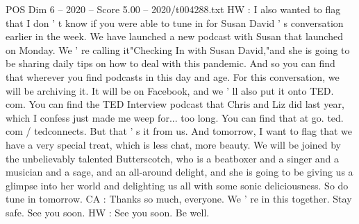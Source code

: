 \begin{textsample}{POS Dim 6 – 2020 – Score 5.00 – 2020/t004288.txt}
HW : I also wanted to flag that I don ' t know if you were able to tune in for Susan David ' s conversation earlier in the week.
We have launched a new podcast with Susan that launched on Monday.
We ' re calling it"Checking In with Susan David,"and she is going to be sharing daily tips on how to deal with this pandemic.
And so you can find that wherever you find podcasts in this day and age.
For this conversation, we will be archiving it.
It will be on Facebook, and we ' ll also put it onto TED. com.
You can find the TED Interview podcast that Chris and Liz did last year, which I confess just made me weep for... too long.
You can find that at go. ted. com / tedconnects.
But that ' s it from us.
And tomorrow, I want to flag that we have a very special treat, which is less chat, more beauty.
We will be joined by the unbelievably talented Butterscotch, who is a beatboxer and a singer and a musician and a sage, and an all-around delight, and she is going to be giving us a glimpse into her world and delighting us all with some sonic deliciousness.
So do tune in tomorrow.
CA : Thanks so much, everyone.
We ' re in this together.
Stay safe.
See you soon.
HW : See you soon.
Be well.

\end{textsample}
